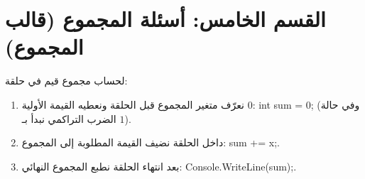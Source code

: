 \documentclass[14pt]{extarticle}
\begin{document}
\section*{القسم الخامس: أسئلة المجموع (قالب المجموع)}

\begin{boxNote}
لحساب مجموع قيم في حلقة:
\begin{enumerate}[nosep]
    \item نعرّف متغير المجموع قبل الحلقة ونعطيه القيمة الأولية $0$: \textenglish{int sum = 0;} (وفي حالة الضرب التراكمي نبدأ بـ $1$).
    \item داخل الحلقة نضيف القيمة المطلوبة إلى المجموع: \textenglish{sum += x;}.
    \item بعد انتهاء الحلقة نطبع المجموع النهائي: \textenglish{Console.WriteLine(sum);}.
\end{enumerate}
\end{boxNote}
\end{document}
